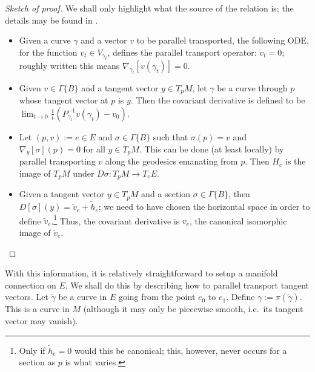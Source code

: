 \documentclass[11pt]{article}
\theoremstyle{remark}
\begin{document}
\begin{proof}[Sketch of proof]
We shall only highlight what the source of the relation is; the
details may be found in \cite{Sp299}.

\begin{itemize}

\item[$(1 \Rightarrow 2)$] Given a curve $\gamma$ and a vector $v$ to
be parallel transported, the following ODE, for the function $v_t \in
V_{\gamma_t}$, defines the parallel transport operator: $\dot{v}_t =
0$; roughly written this means $\nabla_{\dot{\gamma}_t} [v(\gamma_t)] =0$.

\item[$(2 \Rightarrow 1)$] Given $v \in \ensuremath{\Gamma \{ B \}}$ and a tangent
vector $y \in T_p M$, let $\gamma$ be a curve through $p$ 
whose tangent vector at $p$ is $y$. Then the covariant derivative is
defined to be $\lim_{t \to 0} \frac{1}{t}
(P_{\gamma_t}^{-1} v(\gamma_t) - v_0)$.

\item[$(1 \Rightarrow 3)$] Let $(p,v) \ensuremath{:=} e \in E$ and
 $\sigma \in \ensuremath{\Gamma \{ B \}}$ such that $\sigma(p) = v$ and $\nabla_y
[\sigma] (p) = 0$ for all $y \in T_pM$. This can be done (at least
locally) by
parallel transporting $v$ along the geodesics emanating
from $p$. Then $H_e$ is the image of $T_pM$ under $D \sigma : T_pM \to T_eE$.  

\item[$(3 \Rightarrow 1)$]
Given a tangent
vector $y \in T_p M$ and a section $\sigma \in \ensuremath{\Gamma \{ B \}}$, 
then $D [\sigma] (y) = \tilde{v}_e + \tilde{h}_e$; we need to have
chosen the horizontal space in order to define
$\tilde{v}_e$.\footnote{Only if $\tilde{h}_e = 0$ would this be
canonical; this, however, never occurs for a section as $p$ is what varies.}  
Thus, the covariant derivative is $v_e$, the canonical isomorphic
image of $\tilde{v}_e$. 

\end{itemize}
\end{proof}


With this information, it is relatively straightforward to setup a
manifold connection on $E$. We shall do this by describing how to parallel
transport tangent vectors.  
Let $\tilde{\gamma}$ be a curve in $E$ going from the point $e_0$ to
$e_1$. Define $\gamma \ensuremath{:=} \pi(\tilde{\gamma})$. This is a curve in
$M$ (although it may only be piecewise smooth, i.e.\ its tangent
vector may vanish). 
\end{document}
